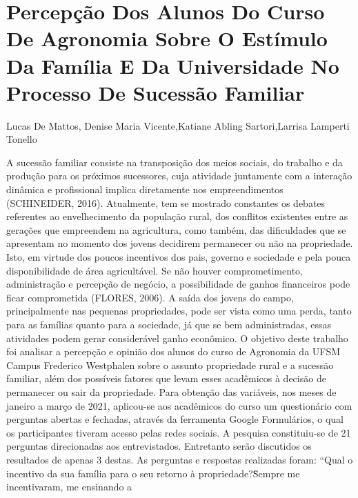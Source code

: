 


\section*{Percepção Dos Alunos Do Curso De Agronomia Sobre O Estímulo Da Família E Da Universidade No Processo De Sucessão Familiar}

Lucas De Mattos, Denise Maria Vicente,Katiane Abling Sartori,Larrisa Lamperti Tonello

A sucessão familiar consiste na transposição dos meios sociais, do trabalho e da produção 
para os próximos sucessores, cuja atividade juntamente com a interação dinâmica e profissional 
implica diretamente nos empreendimentos (SCHINEIDER, 2016). Atualmente, tem se mostrado 
constantes os debates referentes ao envelhecimento da população rural, dos conflitos existentes 
entre as gerações que empreendem na agricultura, como também, das dificuldades que se 
apresentam no momento dos jovens decidirem permanecer ou não na propriedade. Isto, em virtude 
dos poucos incentivos dos pais, governo e sociedade e pela pouca disponibilidade de área 
agricultável. Se não houver comprometimento, administração e percepção de negócio, a 
possibilidade de ganhos financeiros pode ficar comprometida (FLORES, 2006). A saída dos jovens 
do campo, principalmente nas pequenas propriedades, pode ser vista como uma perda, tanto para 
as famílias quanto para a sociedade, já que se bem administradas, essas atividades podem gerar 
considerável ganho econômico. 
O objetivo deste trabalho foi analisar a percepção e opinião dos alunos do curso de 
Agronomia da UFSM Campus Frederico Westphalen sobre o assunto propriedade rural e a 
sucessão familiar, além dos possíveis fatores que levam esses acadêmicos à decisão de permanecer 
ou sair da propriedade. Para obtenção das variáveis, nos meses de janeiro a março de 2021, aplicou-se aos acadêmicos do curso um questionário com perguntas abertas e fechadas, através da 
ferramenta Google Formulários, o qual os participantes tiveram acesso pelas redes sociais. A 
pesquisa constituiu-se de 21 perguntas direcionadas aos entrevistados. Entretanto serão discutidos 
os resultados de apenas 3 destas. As perguntas e respostas realizadas foram: “Qual o incentivo da 
sua família para o seu retorno à propriedade?\"Sempre me incentivaram, me ensinando a 
